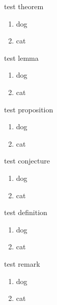 \documentclass{scrartcl}
\begin{document}
\begin{theorem}
    test theorem
    \begin{enumerate}
        \item dog
        \item cat
    \end{enumerate}
\end{theorem}
\begin{lemma}
    test lemma
    \begin{enumerate}
        \item dog
        \item cat
    \end{enumerate}
\end{lemma}
\begin{proposition}
    test proposition
    \begin{enumerate}
        \item dog
        \item cat
    \end{enumerate}
\end{proposition}
\begin{conjecture}
    test conjecture
    \begin{enumerate}
        \item dog
        \item cat
    \end{enumerate}
\end{conjecture}
\begin{definition}
    test definition
    \begin{enumerate}
        \item dog
        \item cat
    \end{enumerate}
\end{definition}
\begin{remark}
    test remark
    \begin{enumerate}
        \item dog
        \item cat
    \end{enumerate}
\end{remark}
\end{document}
